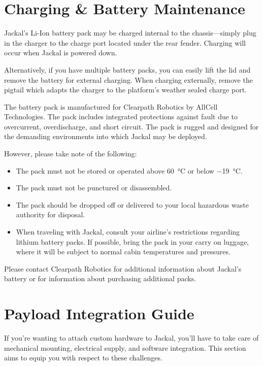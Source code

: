 \documentclass[]{clearpath-latex/clearpath-manual}
\begin{document}
\section{Charging \& Battery Maintenance}

Jackal's Li-Ion battery pack may be charged internal to the chassis---simply plug in
the charger to the charge port located under the rear fender. Charging will occur
when Jackal is powered down.

Alternatively, if you have multiple battery packs, you can easily lift the lid and
remove the battery for external charging. When charging externally, remove the pigtail
which adapts the charger to the platform's weather sealed charge port.

The battery pack is manufactured for Clearpath Robotics by AllCell Technologies. The
pack includes integrated protections against fault due to overcurrent, overdischarge,
and short circuit. The pack is rugged and designed for the demanding environments into
which Jackal may be deployed.

However, please take note of the following:

\begin{itemize}
\item The pack must not be stored or operated above \SI{60}{\celsius} or below \SI{-19}{\celsius}.
\item The pack must not be punctured or disassembled.
\item The pack should be dropped off or delivered to your local hazardous waste authority for disposal.
\item When traveling with Jackal, consult your airline's restrictions regarding lithium
battery packs. If possible, bring the pack in your carry on luggage, where it will
be subject to normal cabin temperatures and pressures.
\end{itemize}

Please contact Clearpath Robotics for additional information about Jackal's battery or
for information about purchasing additional packs.


\section{Payload Integration Guide}

If you're wanting to attach custom hardware to Jackal, you'll have to take care of
mechanical mounting, electrical supply, and software integration. This section
aims to equip you with respect to these challenges.
\end{document}
